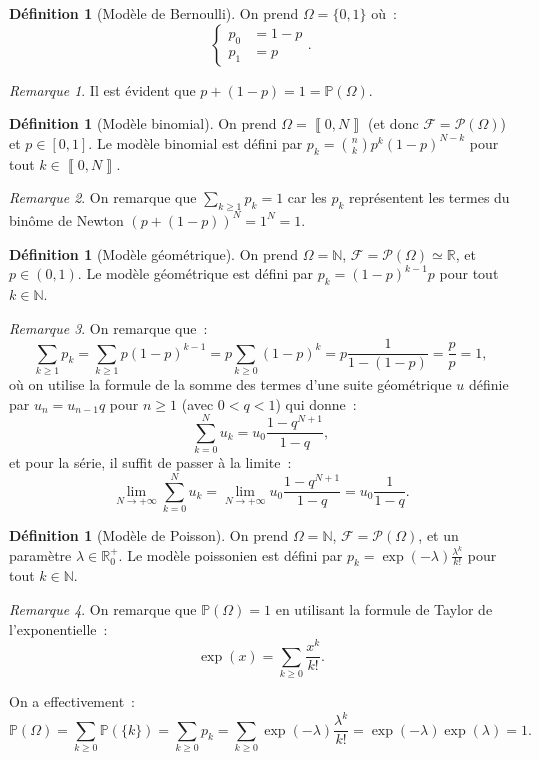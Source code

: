 \documentclass{article}
\newcommand{\N}{\mathbb N}
\renewcommand{\P}{\mathbb P}
\newcommand{\R}{\mathbb R}
\newcommand{\iintv}[2]{\left\llbracket#1, #2\right\rrbracket}
\theoremstyle{definition}
\newtheorem{déf}[thm]{Définition}
\theoremstyle{remark}
\newtheorem*{rmq}{Remarque}
\begin{document}
		\begin{déf}[Modèle de Bernoulli] On prend $\Omega = \{0, 1\}$ où~:
		\[\begin{cases}p_0 &= 1-p \\p_1 &= p\end{cases}.\] \end{déf}

		\begin{rmq} Il est évident que $p + (1-p) = 1 = \P(\Omega)$. \end{rmq}

		\begin{déf}[Modèle binomial] On prend $\Omega = \iintv 0N$ (et donc $\mathcal F = \mathcal P(\Omega)$) et $p \in [0, 1]$.
		Le modèle binomial est défini par $p_k = \binom nkp^k(1-p)^{N-k}$ pour tout $k \in \iintv 0N$. \end{déf}

		\begin{rmq} On remarque que $\sum_{k \geq 1}p_k = 1$ car les $p_k$ représentent les termes du binôme de Newton $(p + (1-p))^N = 1^N = 1$. \end{rmq}

		\begin{déf}[Modèle géométrique] On prend $\Omega = \N$, $\mathcal F = \mathcal P(\Omega) \simeq \R$, et $p \in (0, 1)$. Le modèle géométrique
		est défini par $p_k = (1-p)^{k-1}p$ pour tout $k \in \N$. \end{déf}

		\begin{rmq} On remarque que~:
		\[\sum_{k \geq 1}p_k = \sum_{k \geq 1}p(1-p)^{k-1} = p\sum_{k \geq 0}(1-p)^k = p\frac 1{1-(1-p)} = \frac pp = 1,\]
		où on utilise la formule de la somme des termes d'une suite géométrique $u$ définie par $u_n = u_{n-1}q$ pour $n \geq 1$ (avec $0 < q < 1$) qui donne~:
		\[\sum_{k=0}^Nu_k = u_0\frac {1 - q^{N+1}}{1-q},\]
		et pour la série, il suffit de passer à la limite~:
		\[\lim_{N \to +\infty}\sum_{k=0}^Nu_k = \lim_{N \to +\infty}u_0\frac {1 - q^{N+1}}{1-q} = u_0\frac 1{1-q}.\]
		\end{rmq}

		\begin{déf}[Modèle de Poisson] On prend $\Omega  =\N$, $\mathcal F = \mathcal P(\Omega)$, et un paramètre $\lambda \in \R_0^+$.
		Le modèle poissonien est défini par $p_k = \exp(-\lambda)\frac {\lambda^k}{k!}$ pour tout $k \in \N$. \end{déf}

		\begin{rmq} On remarque que $\P(\Omega) = 1$ en utilisant la formule de Taylor de l'exponentielle~:
		\[\exp(x) = \sum_{k \geq 0}\frac {x^k}{k!}.\]

		On a effectivement~:
		\[\P(\Omega) = \sum_{k \geq 0}\P(\{k\}) = \sum_{k \geq 0}p_k = \sum_{k \geq 0}\exp(-\lambda)\frac {\lambda^k}{k!} = \exp(-\lambda)\exp(\lambda) = 1.\]
		\end{rmq}
\end{document}
